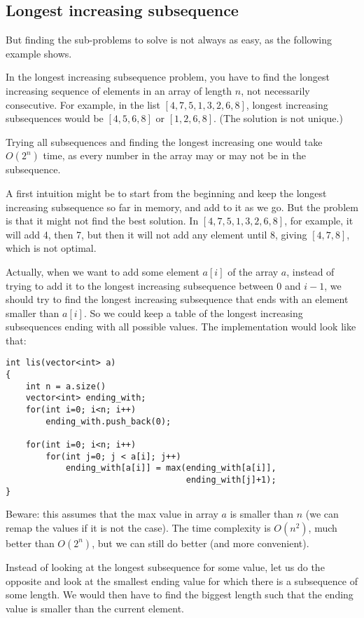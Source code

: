 \subsection{Longest increasing subsequence}

But finding the sub-problems to solve is not always as easy,
as the following example shows.

In the longest increasing subsequence problem, you have to find the longest
increasing sequence of elements in an array of length $n$,
not necessarily consecutive.
For example, in the list $[4,7,5,1,3,2,6,8]$, longest increasing subsequences
would be $[4,5,6,8]$ or $[1,2,6,8]$. (The solution is not unique.)

Trying all subsequences and finding the longest increasing one would
take $O(2^n)$ time, as every number in the array may or may not be in
the subsequence.

A first intuition might be to start from the beginning and keep the longest
increasing subsequence so far in memory, and add to it as we go.
But the problem is that it might not find the best solution.
In $[4,7,5,1,3,2,6,8]$, for example, it will add 4, then 7, but then
it will not add any element until 8, giving $[4,7,8]$, which is not optimal.

Actually, when we want to add some element $a[i]$ of the array $a$,
instead of trying to add it to the longest increasing subsequence
between $0$ and $i-1$, we should try to find the longest
increasing subsequence that ends with an element smaller than $a[i]$.
So we could keep a table of the longest increasing subsequences
ending with all possible values.
The implementation would look like that:
\begin{verbatim}
int lis(vector<int> a)
{
    int n = a.size()
    vector<int> ending_with;
    for(int i=0; i<n; i++)
        ending_with.push_back(0);

    for(int i=0; i<n; i++)
        for(int j=0; j < a[i]; j++)
            ending_with[a[i]] = max(ending_with[a[i]],
                                    ending_with[j]+1);
}
\end{verbatim}
Beware: this assumes that the max value in array $a$ is smaller than $n$
(we can remap the values if it is not the case).
The time complexity is $O(n^2)$, much better than $O(2^n)$,
but we can still do better (and more convenient).

Instead of looking at the longest subsequence for some value,
let us do the opposite
and look at the smallest ending value for which there is a subsequence
of some length.
We would then have to find the biggest length such that the ending value
is smaller than the current element.


